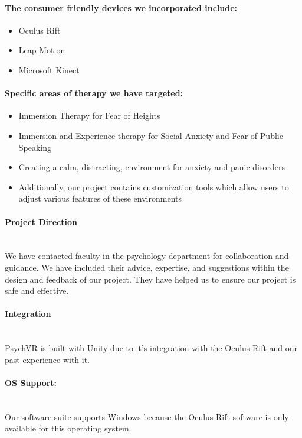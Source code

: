 \documentclass[a4paper,10pt]{article}
\begin{document}
	\paragraph{The consumer friendly devices we incorporated include:}
	\begin{itemize}
		\item Oculus Rift
		\item Leap Motion
		\item Microsoft Kinect
	\end{itemize}
	
	\paragraph{Specific areas of therapy we have targeted:}
	\begin{itemize}
		\item Immersion Therapy for Fear of Heights
		\item Immersion and Experience therapy for Social Anxiety and Fear of Public Speaking
		\item Creating a calm, distracting, environment for anxiety and panic disorders
		\item Additionally, our project contains customization tools which allow users to adjust various features of these environments
	\end{itemize}
	
	
	\paragraph{Project Direction} ~\\ We have contacted faculty in the psychology department for collaboration and guidance. We have included their advice, expertise, and suggestions within the design and feedback of our project.  They have helped us to ensure our project is safe and effective.
	\paragraph{Integration} ~\\ PsychVR is built with Unity due to it's integration with the Oculus Rift and our past experience with it.
	\paragraph{OS Support:} ~\\ Our software suite supports Windows because the Oculus Rift software is only available for this operating system.
	
\end{document}

